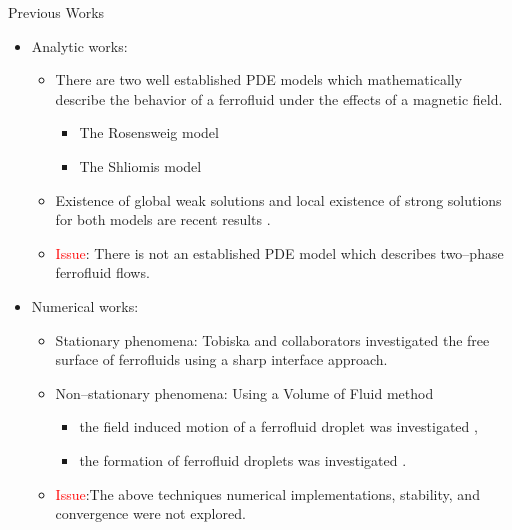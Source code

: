 \documentclass[9pt]{beamer}
\begin{document}
\begin{frame}{Previous Works}
	\begin{itemize}
		\item Analytic works:
		\begin{itemize}
			\item There are two well established PDE models which mathematically describe the behavior of a ferrofluid under the effects of a magnetic field.
			\begin{itemize}
				\item The Rosensweig model
				\item The Shliomis model 
			\end{itemize}
			\item Existence of global weak solutions and local existence of strong solutions for both models are recent results \cite{PDEResults:1,PDEResults:2, PDEResults:3, PDEResults:4}.
			\item \textcolor{red}{Issue}: There is not an established PDE model which describes two--phase ferrofluid flows.
		\end{itemize}
	
		\item Numerical works:
		\begin{itemize}
			\item Stationary phenomena: Tobiska and collaborators investigated the free surface of ferrofluids using a sharp interface approach.
			\item Non--stationary phenomena: Using a Volume of Fluid method
			\begin{itemize}
				\item  the field induced motion of a ferrofluid droplet was investigated \cite{Numerics:1},
				\item  the formation of ferrofluid droplets was investigated \cite{Numerics:2}.
			\end{itemize}
			\item \textcolor{red}{Issue}:The above techniques numerical implementations, stability, and convergence were not explored.
		\end{itemize}
	\end{itemize}
\end{frame}
\end{document}

